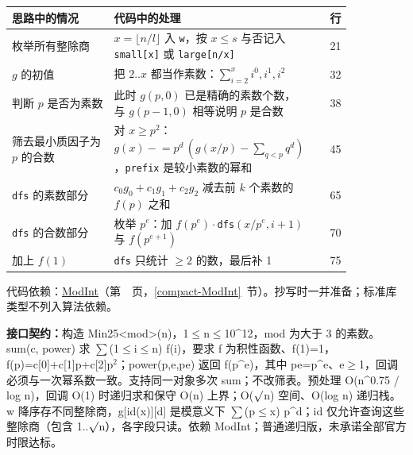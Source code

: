 \begin{center}\small
\begin{tabular}{@{}p{0.30\linewidth}p{0.55\linewidth}r@{}}
\toprule
思路中的情况 & 代码中的处理 & 行\\
\midrule
枚举所有整除商 & $x=\lfloor n/l\rfloor$ 入 \texttt{w}，按 $x\le s$ 与否记入 \texttt{small[x]} 或 \texttt{large[n/x]} & 21\\
$g$ 的初值 & 把 $2..x$ 都当作素数：$\sum_{i=2}^{x}i^0,i^1,i^2$ & 32\\
判断 $p$ 是否为素数 & 此时 $g(p,0)$ 已是精确的素数个数，与 $g(p-1,0)$ 相等说明 $p$ 是合数 & 38\\
筛去最小质因子为 $p$ 的合数 & 对 $x\ge p^2$：$g(x)\mathrel{-}=p^d\,(g(x/p)-\sum_{q<p}q^d)$，\texttt{prefix} 是较小素数的幂和 & 45\\
\texttt{dfs} 的素数部分 & $c_0g_0+c_1g_1+c_2g_2$ 减去前 $k$ 个素数的 $f(p)$ 之和 & 65\\
\texttt{dfs} 的合数部分 & 枚举 $p^e$：加 $f(p^e)\cdot$\texttt{dfs}$(x/p^e,i+1)$ 与 $f(p^{e+1})$ & 70\\
加上 $f(1)$ & \texttt{dfs} 只统计 $\ge2$ 的数，最后补 1 & 75\\
\bottomrule
\end{tabular}
\end{center}

代码依赖：\hyperref[compact-ModInt]{ModInt}（第~\pageref{compact-ModInt}~页，\ref{compact-ModInt}~节）。抄写时一并准备；标准库类型不列入算法依赖。

{\sloppy{}\noindent\textbf{接口契约：}构造 Min25<mod>(n)，1$\le$n$\le$10\textasciicircum{}12，mod 为大于 3 的素数。sum(c, power) 求 $\sum$(1$\le$i$\le$n) f(i)，要求 f 为积性函数、f(1)=1，f(p)=c[0]+c[1]p+c[2]p$^{2}$；power(p,e,pe) 返回 f(p\textasciicircum{}e)，其中 pe=p\textasciicircum{}e、e$\ge$1，回调必须与一次幂系数一致。支持同一对象多次 sum；不改筛表。预处理 O(n\textasciicircum{}0.75 / log n)，回调 O(1) 时递归求和保守 O(n) 上界；O($\sqrt{\vphantom x}$n) 空间、O(log n) 递归栈。w 降序存不同整除商，g[id(x)][d] 是模意义下 $\sum$(p$\le$x) p\textasciicircum{}d；id 仅允许查询这些整除商（包含 1..$\sqrt{\vphantom x}$n），各字段只读。依赖 ModInt；普通递归版，未承诺全部官方时限达标。\par}

\Needspace{479pt}



\newpage



